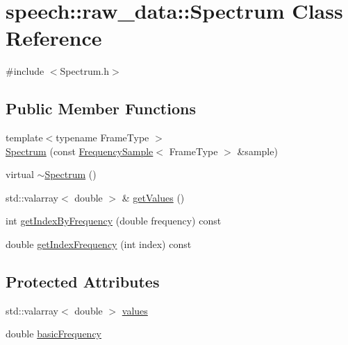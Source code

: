 \hypertarget{classspeech_1_1raw__data_1_1Spectrum}{\section{speech\+:\+:raw\+\_\+data\+:\+:Spectrum Class Reference}
\label{classspeech_1_1raw__data_1_1Spectrum}
}


{\ttfamily \#include $<$Spectrum.\+h$>$}

\subsection*{Public Member Functions}
\begin{DoxyCompactItemize}
\item 
{\footnotesize template$<$typename Frame\+Type $>$ }\\\hyperlink{classspeech_1_1raw__data_1_1Spectrum_a4a08dc8f79816c923ce2bb27c87ab4cf}{Spectrum} (const \hyperlink{classspeech_1_1raw__data_1_1FrequencySample}{Frequency\+Sample}$<$ Frame\+Type $>$ \&sample)
\item 
virtual \hyperlink{classspeech_1_1raw__data_1_1Spectrum_ac7ad7ef0a8311a2977c2ba3cdbb6af10}{$\sim$\+Spectrum} ()
\item 
std\+::valarray$<$ double $>$ \& \hyperlink{classspeech_1_1raw__data_1_1Spectrum_ace0941220cc60817990d8fbff08e4ba2}{get\+Values} ()
\item 
int \hyperlink{classspeech_1_1raw__data_1_1Spectrum_a32139a1fb7e069a9c906fc2f32b815cf}{get\+Index\+By\+Frequency} (double frequency) const 
\item 
double \hyperlink{classspeech_1_1raw__data_1_1Spectrum_a1833b3262d635ffd6cebd7a8b6ebb0ad}{get\+Index\+Frequency} (int index) const 
\end{DoxyCompactItemize}
\subsection*{Protected Attributes}
\begin{DoxyCompactItemize}
\item 
std\+::valarray$<$ double $>$ \hyperlink{classspeech_1_1raw__data_1_1Spectrum_a8c1ec60def3d84bf834c0fbc3fa44481}{values}
\item 
double \hyperlink{classspeech_1_1raw__data_1_1Spectrum_aa6105ce4e446b344a979dff6980d2d99}{basic\+Frequency}
\end{DoxyCompactItemize}


